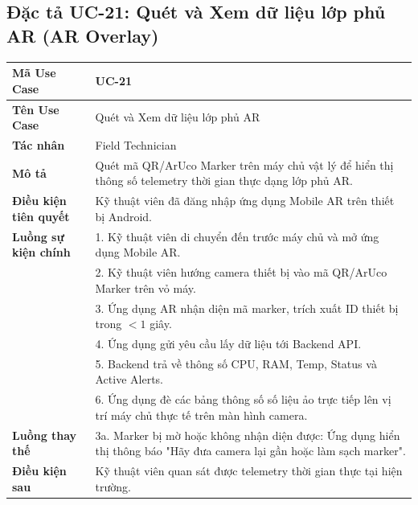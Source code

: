 \subsection{Đặc tả UC-21: Quét và Xem dữ liệu lớp phủ AR (AR Overlay)}
\begin{table}[H]
\centering
\begin{tabular}{|p{4cm}|p{10.5cm}|}
\hline
\textbf{Mã Use Case} & \textbf{UC-21} \\ \hline
\textbf{Tên Use Case} & Quét và Xem dữ liệu lớp phủ AR \\ \hline
\textbf{Tác nhân} & Field Technician \\ \hline
\textbf{Mô tả} & Quét mã QR/ArUco Marker trên máy chủ vật lý để hiển thị thông số telemetry thời gian thực dạng lớp phủ AR. \\ \hline
\textbf{Điều kiện tiên quyết} & Kỹ thuật viên đã đăng nhập ứng dụng Mobile AR trên thiết bị Android. \\ \hline
\textbf{Luồng sự kiện chính} & 
1. Kỹ thuật viên di chuyển đến trước máy chủ và mở ứng dụng Mobile AR.\\ 
& 2. Kỹ thuật viên hướng camera thiết bị vào mã QR/ArUco Marker trên vỏ máy.\\ 
& 3. Ứng dụng AR nhận diện mã marker, trích xuất ID thiết bị trong $< 1$ giây.\\ 
& 4. Ứng dụng gửi yêu cầu lấy dữ liệu tới Backend API.\\ 
& 5. Backend trả về thông số CPU, RAM, Temp, Status và Active Alerts.\\ 
& 6. Ứng dụng đè các bảng thông số số liệu ảo trực tiếp lên vị trí máy chủ thực tế trên màn hình camera. \\ \hline
\textbf{Luồng thay thế} & 3a. Marker bị mờ hoặc không nhận diện được: Ứng dụng hiển thị thông báo "Hãy đưa camera lại gần hoặc làm sạch marker". \\ \hline
\textbf{Điều kiện sau} & Kỹ thuật viên quan sát được telemetry thời gian thực tại hiện trường. \\ \hline
\end{tabular}
\end{table}

